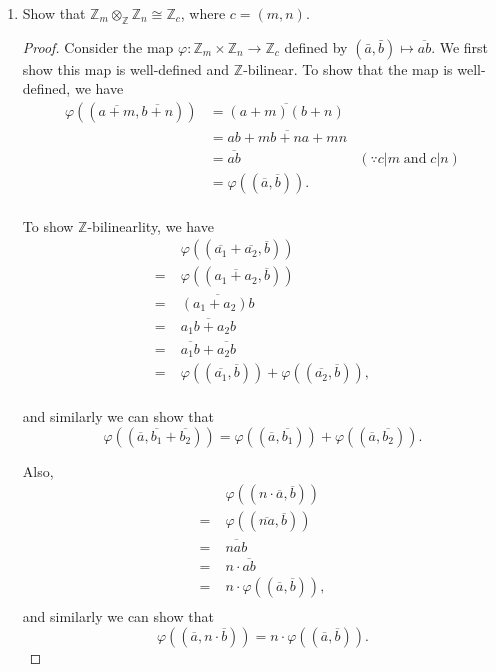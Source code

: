 \documentclass{article}
\begin{document}
\begin{enumerate}[label={(\alph*)}]
    \item Show that $\mathbb{Z}_m\otimes_\mathbb{Z}\mathbb{Z}_n
      \cong\mathbb{Z}_c$, where $c=(m,n)$.
      \begin{proof}
        Consider the map $\varphi:\mathbb{Z}_m\times\mathbb{Z}_n
        \rightarrow\mathbb{Z}_c$ defined by
        $(\bar{a},\bar{b})\mapsto\overline{ab}$. We first show this map is
        well-defined and $\mathbb{Z}$-bilinear. To show that the map is
        well-defined, we have
        \begin{align*}
          \varphi((\overline{a+m},\overline{b+n}))
            &=\overline{(a+m)(b+n)}\\
          &=\overline{ab+mb+na+mn}\\
          &=\overline{ab} &(\because c|m\; \text{and}\; c|n)\\
          &=\varphi((\overline{a},\overline{b})).\\
        \end{align*}

        To show $\mathbb{Z}$-bilinearlity, we have
        \begin{align*}
          &\;\varphi((\overline{a_1}+\overline{a_2},\overline{b}))\\
          =&\;\varphi((\overline{a_1+a_2},\overline{b}))\\
          =&\;\overline{(a_1+a_2)b}\\
          =&\;\overline{a_1b+a_2b}\\
          =&\;\overline{a_1b} +\overline{a_2b}\\
          =&\;\varphi((\overline{a_1},\overline{b}))
            +\varphi((\overline{a_2},\overline{b})),\\
        \end{align*}

        and similarly we can show that
        \[\varphi((\overline{a},\overline{b_1}+\overline{b_2}))
          =\varphi((\overline{a},\overline{b_1}))
          +\varphi((\overline{a},\overline{b_2})).\]

        Also,
        \begin{align*}
          &\;\varphi((n\cdot\overline{a},\overline{b}))\\
          =&\;\varphi((\overline{na},\overline{b}))\\
          =&\;\overline{nab}\\
          =&\;n\cdot\overline{ab}\\
          =&\;n\cdot\varphi((\overline{a},\overline{b})),\\
        \end{align*}
        and similarly we can show that
        \[\varphi((\overline{a},n\cdot\overline{b}))
          =n\cdot\varphi((\overline{a},\overline{b})).\]


\end{proof}
\end{enumerate}
\end{document}
